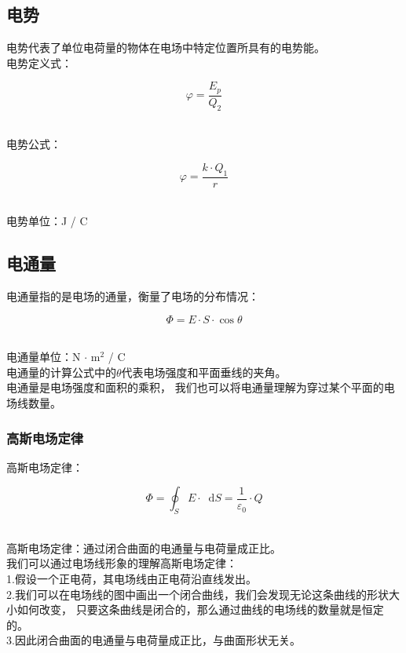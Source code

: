 \documentclass[UTF8]{ctexart}
\newcommand*{\dif}{\mathop{}\!\mathrm{d}}
\begin{document}
\newpage

\subsection{电势}
    电势代表了单位电荷量的物体在电场中特定位置所具有的电势能。\\[3mm]
    电势定义式：\vspace{3pt}
    \begin{large}
        \begin{equation*}
            \varphi=\frac{E_p}{Q_2}
        \end{equation*}
    \end{large}\\
    电势公式：\vspace{3pt}
    \begin{large}
        \begin{equation*}
            \varphi=\frac{k\cdot Q_{1}}{r}
        \end{equation*}
    \end{large}\\
    电势单位：J / C\\

\subsection{电通量}
    电通量指的是电场的通量，衡量了电场的分布情况：
    \begin{large}
        \begin{equation*}
            \Phi=E\cdot S\cdot \cos{\theta}
        \end{equation*}
    \end{large}\\
    电通量单位：N $\cdot$ m$^2$ / C\\[3mm]
    电通量的计算公式中的$\theta$代表电场强度和平面垂线的夹角。\\[3mm]
    电通量是电场强度和面积的乘积，
    我们也可以将电通量理解为穿过某个平面的电场线数量。\vspace{3pt}

\subsubsection{高斯电场定律}
    高斯电场定律：\vspace{5pt}
    \begin{large}
        \begin{equation*}
            \Phi=\oint_SE \cdot \dif S=\frac{1}{\varepsilon_0}\cdot Q
        \end{equation*}
    \end{large}\\
    高斯电场定律：通过闭合曲面的电通量与电荷量成正比。\\[8mm]
    我们可以通过电场线形象的理解高斯电场定律：\\[3mm]
    1.假设一个正电荷，其电场线由正电荷沿直线发出。\\[3mm]
    2.我们可以在电场线的图中画出一个闭合曲线，我们会发现无论这条曲线的形状大小如何改变，
    只要这条曲线是闭合的，那么通过曲线的电场线的数量就是恒定的。\\[3mm]
    3.因此闭合曲面的电通量与电荷量成正比，与曲面形状无关。
\end{document}

